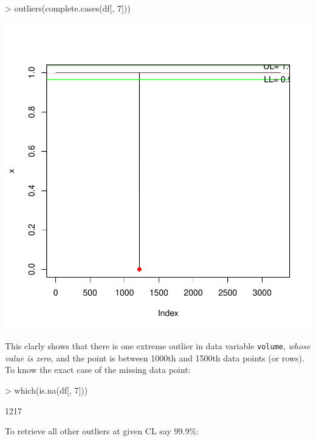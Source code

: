 \documentclass{article}
\begin{document}
\begin{Schunk}
\begin{Sinput}
> outliers(complete.cases(df[, 7]))
\end{Sinput}
\end{Schunk}
\includegraphics{anadetect-012}

This clarly shows that there is one extreme outlier in data variable \texttt{volume},  \emph{whose value is zero}, and the point is between 1000th and 1500th data points (or rows). To know the exact case of the missing data point:

\begin{Schunk}
\begin{Sinput}
> which(is.na(df[, 7]))
\end{Sinput}
\begin{Soutput}
[1] 1217
\end{Soutput}
\end{Schunk}

To retrieve all other outliers at given CL say 99.9\%: 
\end{document}
